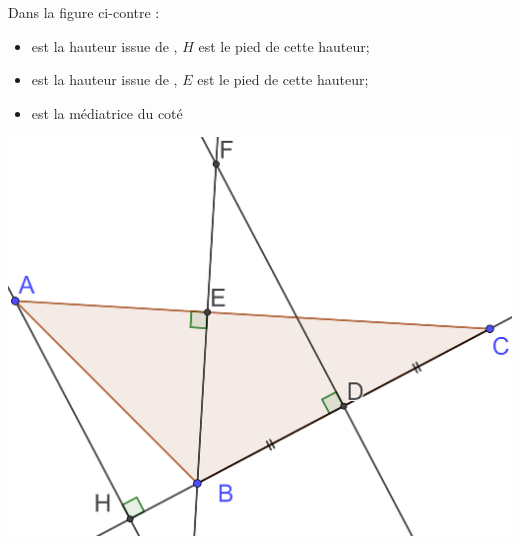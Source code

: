 \documentclass[12pt,a4paper]{article}
\begin{document}
\begin{myexs}
	\begin{multicols}{2}
		Dans la figure ci-contre :
		
		\begin{itemize}
			\item \hspace*{1cm} est la hauteur issue de \hspace*{1cm}, $H$ est le pied de cette hauteur;
			\item \hspace*{1cm} est la hauteur issue de \hspace*{1cm}, $E$ est le pied de cette hauteur;
			\item \hspace*{1cm} est la médiatrice du coté 
		\end{itemize}
		\begin{center}
			\includegraphics[scale=0.15]{droites}
		\end{center}
	\end{multicols}
\end{myexs}
\end{document}
